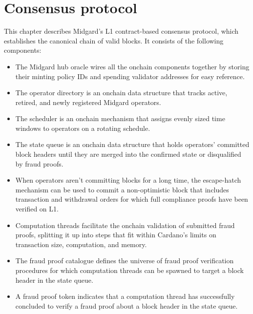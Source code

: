 \documentclass[../midgard.tex]{subfiles}
\begin{document}
\chapter{Consensus protocol}
\label{h:consensus-protocol}

This chapter describes Midgard's L1 contract-based consensus protocol, which establishes the canonical chain of valid blocks.
It consists of the following components:

\begin{itemize}
    \item The Midgard hub oracle wires all the onchain components together by storing their minting policy IDs and spending validator addresses for easy reference.
    \item The operator directory is an onchain data structure that tracks active, retired, and newly registered Midgard operators.
    \item The scheduler is an onchain mechanism that assigns evenly sized time windows to operators on a rotating schedule.
    \item The state queue is an onchain data structure that holds operators' committed block headers until they are merged into the confirmed state or disqualified by fraud proofs.
    \item When operators aren't committing blocks for a long time, the escape-hatch mechanism can be used to commit a non-optimistic block that includes transaction and withdrawal orders for which full compliance proofs have been verified on L1.
    \item Computation threads facilitate the onchain validation of submitted fraud proofs, splitting it up into steps that fit within Cardano's limits on transaction size, computation, and memory.
    \item The fraud proof catalogue defines the universe of fraud proof verification procedures for which computation threads can be spawned to target a block header in the state queue.
    \item A fraud proof token indicates that a computation thread has successfully concluded to verify a fraud proof about a block header in the state queue.
\end{itemize}
\end{document}
